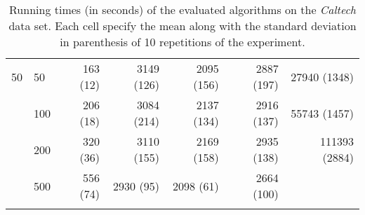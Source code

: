\begin{longtable}{llrrrrr}
 \midrule
50 & 50  &  163 (12) &     3149 (126) &  2095 (156) &           2887 (197) &   27940 (1348) \\
   & 100 &  206 (18) &     3084 (214) &  2137 (134) &           2916 (137) &   55743 (1457) \\
   & 200 &  320 (36) &     3110 (155) &  2169 (158) &           2935 (138) &  111393 (2884) \\
   & 500 &  556 (74) &      2930 (95) &   2098 (61) &           2664 (100) &             \\
\bottomrule
\caption{Running times (in seconds) of the evaluated algorithms on the \textit{Caltech} data set. Each cell specify the mean along with the standard deviation in parenthesis of 10 repetitions of the experiment.}
\label{tab:running-time-mean-caltech}
\end{longtable}

